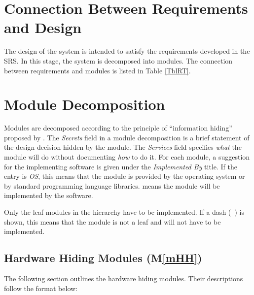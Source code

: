 \documentclass[12pt, titlepage]{article}
\newcommand{\mref}[1]{M\ref{#1}}
\begin{document}
\section{Connection Between Requirements and Design} \label{SecConnection}

The design of the system is intended to satisfy the requirements developed in
the SRS. In this stage, the system is decomposed into modules. The connection
between requirements and modules is listed in Table \ref{TblRT}.



\section{Module Decomposition} \label{SecMD}

Modules are decomposed according to the principle of ``information hiding''
proposed by \citet{ParnasEtAl1984}. The \emph{Secrets} field in a module
decomposition is a brief statement of the design decision hidden by the
module. The \emph{Services} field specifies \emph{what} the module will do
without documenting \emph{how} to do it. For each module, a suggestion for the
implementing software is given under the \emph{Implemented By} title. If the
entry is \emph{OS}, this means that the module is provided by the operating
system or by standard programming language libraries.  \emph{\progname{}} means the
module will be implemented by the \progname{} software.

Only the leaf modules in the hierarchy have to be implemented. If a dash
(\emph{--}) is shown, this means that the module is not a leaf and will not have
to be implemented.

\subsection{Hardware Hiding Modules (\mref{mHH})}
The following section outlines the hardware hiding modules. Their 
descriptions follow the format below: 
\end{document}
